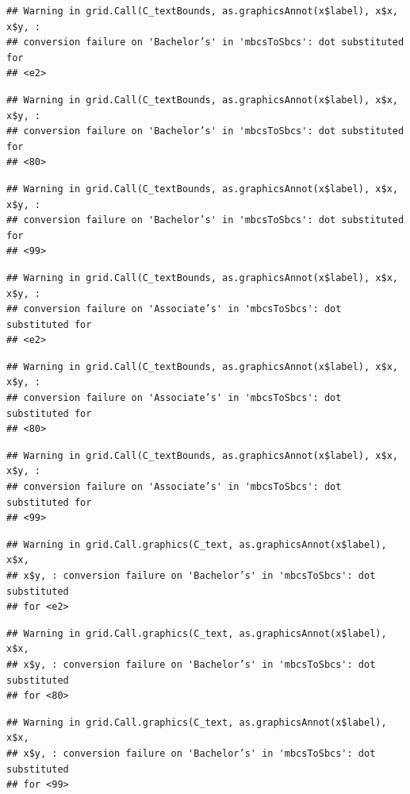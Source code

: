 \documentclass[
]{article}
\begin{document}
\begin{verbatim}
## Warning in grid.Call(C_textBounds, as.graphicsAnnot(x$label), x$x, x$y, :
## conversion failure on 'Bachelor’s' in 'mbcsToSbcs': dot substituted for
## <e2>
\end{verbatim}

\begin{verbatim}
## Warning in grid.Call(C_textBounds, as.graphicsAnnot(x$label), x$x, x$y, :
## conversion failure on 'Bachelor’s' in 'mbcsToSbcs': dot substituted for
## <80>
\end{verbatim}

\begin{verbatim}
## Warning in grid.Call(C_textBounds, as.graphicsAnnot(x$label), x$x, x$y, :
## conversion failure on 'Bachelor’s' in 'mbcsToSbcs': dot substituted for
## <99>
\end{verbatim}

\begin{verbatim}
## Warning in grid.Call(C_textBounds, as.graphicsAnnot(x$label), x$x, x$y, :
## conversion failure on 'Associate’s' in 'mbcsToSbcs': dot substituted for
## <e2>
\end{verbatim}

\begin{verbatim}
## Warning in grid.Call(C_textBounds, as.graphicsAnnot(x$label), x$x, x$y, :
## conversion failure on 'Associate’s' in 'mbcsToSbcs': dot substituted for
## <80>
\end{verbatim}

\begin{verbatim}
## Warning in grid.Call(C_textBounds, as.graphicsAnnot(x$label), x$x, x$y, :
## conversion failure on 'Associate’s' in 'mbcsToSbcs': dot substituted for
## <99>
\end{verbatim}

\begin{verbatim}
## Warning in grid.Call.graphics(C_text, as.graphicsAnnot(x$label), x$x,
## x$y, : conversion failure on 'Bachelor’s' in 'mbcsToSbcs': dot substituted
## for <e2>
\end{verbatim}

\begin{verbatim}
## Warning in grid.Call.graphics(C_text, as.graphicsAnnot(x$label), x$x,
## x$y, : conversion failure on 'Bachelor’s' in 'mbcsToSbcs': dot substituted
## for <80>
\end{verbatim}

\begin{verbatim}
## Warning in grid.Call.graphics(C_text, as.graphicsAnnot(x$label), x$x,
## x$y, : conversion failure on 'Bachelor’s' in 'mbcsToSbcs': dot substituted
## for <99>
\end{verbatim}
\end{document}
